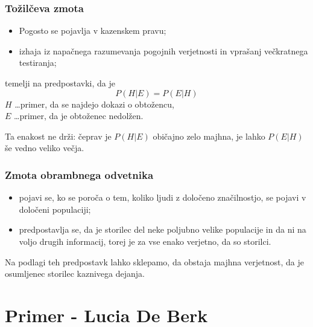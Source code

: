\documentclass{beamer}
\begin{document}
\begin{frame}
  \frametitle{Tožilčeva zmota}
\begin{itemize}
  \item Pogosto se pojavlja v kazenskem pravu;
  \item izhaja iz napačnega razumevanja pogojnih verjetnosti in vprašanj večkratnega testiranja; \vspace{3mm}
\end{itemize}
temelji na predpostavki, da je 
\begin{equation}
  P(H \lvert E) = P(E \lvert H)
\end{equation}
$H$ \dots primer, da se najdejo dokazi o obtožencu, \\
$E$ \dots primer, da je obtoženec nedolžen. \vspace{3mm}

Ta enakost ne drži: čeprav je $P(H \lvert E)$ običajno zelo majhna, je lahko $P(E \lvert H)$ še vedno veliko večja. \\ 
\end{frame}

\begin{frame}
  \frametitle{Zmota obrambnega odvetnika}
\begin{itemize}
  \item pojavi se, ko se poroča o tem, koliko ljudi z določeno značilnostjo, se pojavi v določeni populaciji;
  \item predpostavlja se, da je storilec del neke poljubno velike populacije in da ni na voljo drugih informacij, torej je za vse enako verjetno, 
  da so storilci. \vspace{3mm}
\end{itemize}
Na podlagi teh predpostavk lahko sklepamo, da obstaja majhna verjetnost, da je osumljenec storilec kaznivega dejanja. \\
\end{frame}

\section{Primer - Lucia De Berk}
\end{document}
